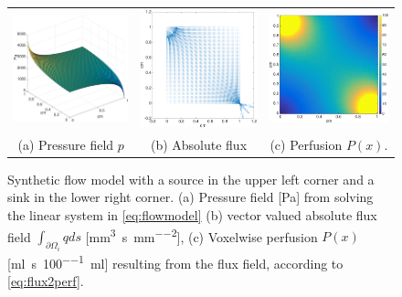 \documentclass[paper=a4, fontsize=11pt,parskip=half,headings=small]{scrartcl}
\newcommand{\siPml}{\milli\litre\per\second\per100\milli\litre}
\newcommand{\siq}{\milli\meter\cubed\per\second\per\milli\meter\squared}
\begin{document}
	\begin{figure}[H]
		\centering
		\begin{tabular}{c c c}
			\includegraphics[width=.3\textwidth]{figs/pressure.eps} & \includegraphics[width=.3\textwidth]{figs/flowQuiver.eps} & \includegraphics[width=.3\textwidth]{figs/perfusion.eps}\\
			(a) Pressure field $p$ & (b) Absolute flux & (c) Perfusion $P(x)$.
		\end{tabular}
    	\caption{Synthetic flow model with a source in the upper left corner and a sink in the lower right corner. (a) Pressure field [\si{\pascal}] from solving the linear system in \eqref{eq:flowmodel}  (b) vector valued absolute flux field $\int_{\partial \Omega_i}q ds$ [\si{\siq}], (c) Voxelwise perfusion $P(x)$ [\si{\siPml}] resulting from  the flux field, according to \eqref{eq:flux2perf}.}
	        \label{fig:flowpressureperfusion}
	\end{figure}
	
\end{document}
